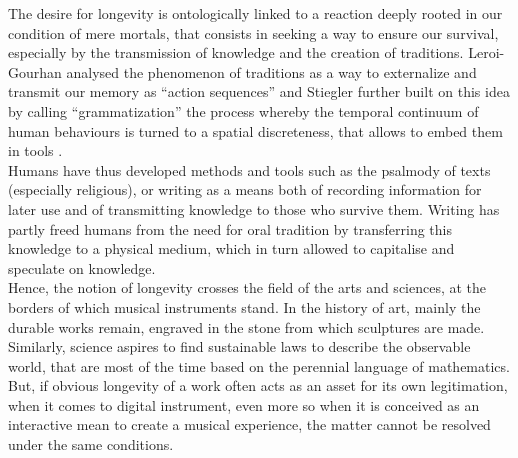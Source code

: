 The desire for longevity is ontologically linked to a reaction deeply rooted in our condition of mere mortals, that consists in seeking a way to ensure our survival, especially by the transmission of knowledge and the creation of traditions. Leroi-Gourhan analysed the phenomenon of traditions as a way to externalize and transmit our memory as “action sequences” \cite{leroi-gourhan_geste_1964} and Stiegler further built on this idea by calling “grammatization” the process whereby the temporal continuum of human behaviours is turned to a spatial discreteness, that allows to embed them in tools \cite{stiegler_for_2010}.\\
\indent Humans have thus developed methods and tools such as the psalmody of texts (especially religious), or writing as a means both of recording information for later use and of transmitting knowledge to those who survive them. Writing has partly freed humans from the need for oral tradition by transferring this knowledge to a physical medium, which in turn allowed to capitalise and speculate on knowledge.\\
\indent Hence, the notion of longevity crosses the field of the arts and sciences, at the borders of which musical instruments stand. In the history of art, mainly the durable works remain, engraved in the stone from which sculptures are made. Similarly, science aspires to find sustainable laws to describe the observable world, that are most of the time based on the perennial language of mathematics. But, if obvious longevity of a work often acts as an asset for its own legitimation, when it comes to digital instrument, even more so when it is conceived as an interactive mean to create a musical experience, the matter cannot be resolved under the same conditions.
	
